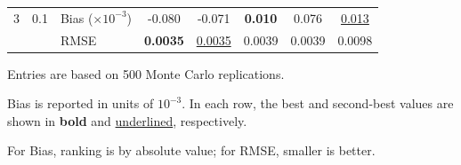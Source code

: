 \begin{table}[!htbp]
\begin{threeparttable}
\begin{tabular}{lllccccc}
3 & 0.1 & Bias ($\times 10^{-3}$) & -0.080 & -0.071 & \textbf{0.010} & 0.076 & \underline{0.013} \\
 &  & RMSE & \textbf{0.0035} & \underline{0.0035} & 0.0039 & 0.0039 & 0.0098 \\
\bottomrule
\end{tabular}
\begin{tablenotes}[flushleft]
\footnotesize
\item Entries are based on 500 Monte Carlo replications.
\item Bias is reported in units of $10^{-3}$. In each row, the best and second-best values are shown in \textbf{bold} and \underline{underlined}, respectively.
\item For Bias, ranking is by absolute value; for RMSE, smaller is better.
\end{tablenotes}
\end{threeparttable}
\end{table}
